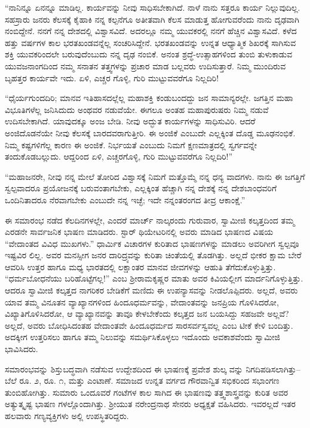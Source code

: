 “ನಾನಿನ್ನೂ ಏನನ್ನೂ ಮಾಡಿಲ್ಲ. ಕಾರ್ಯವನ್ನು ನೀವು ಸಾಧಿಸಬೇಕಾಗಿದೆ. ನಾಳೆ ನಾನು ಸತ್ತರೂ ಕಾರ್ಯ ನಿಲ್ಲುವುದಿಲ್ಲ. ಸಹಸ್ರಾರು ಜನರು ಕೆಲಸಕ್ಕೆ ಕೈಹಾಕಿ ನನ್ನ ಕಲ್ಪನೆಗೂ ಅತೀತವಾಗಿ ಕೆಲಸ ಮಾಡುತ್ತ ಹೋಗುವರೆಂದು ನಾನು ದೃಢವಾಗಿ ನಂಬಿದ್ದೇನೆ. ನನಗೆ ನನ್ನ ದೇಶದಲ್ಲಿ ವಿಶ್ವಾಸವಿದೆ. ಅದರಲ್ಲೂ ನಮ್ಮ ಯುವಕರಲ್ಲಿ ನನಗೆ ಹೆಚ್ಚಿನ ವಿಶ್ವಾಸವಿದೆ. ಕಳೆದ ಹತ್ತು ವರ್ಷಗಳ ಕಾಲ ಭರತಖಂಡವನ್ನೆಲ್ಲ ಸಂಚರಿಸಿದ್ದೇನೆ. ಭರತಖಂಡವನ್ನು ಉನ್ನತ ಆಧ್ಯಾತ್ಮಿಕ ಶಿಖರಕ್ಕೆ ಸಾಗಿಸುವ ಶಕ್ತಿ ಯುವಕರಿಂದಲೇ ಬರುವುದೆಂಬುದು ನನ್ನ ದೃಢ ನಂಬಿಕೆ. ಅನಂತ ಶ್ರದ್ಧೆ-ಉತ್ಸಾಹಗಳಿಂದ ತುಂಬಿ ತುಳುಕಾಡುವ ಯುವಜನಾಂಗದಿಂದ ನಮ್ಮ ಸನಾತನ ತತ್ತ್ವಗಳನ್ನು ಪ್ರಚಾರ ಮಾಡ ಬಲ್ಲವರು ಉದಿಸುತ್ತಾರೆ. ನಿಮ್ಮ ಮುಂದಿರುವ ಬೃಹತ್ತರ ಕಾರ್ಯವೇ ಇದು. ಏಳಿ, ಎಚ್ಚರ ಗೊಳ್ಳಿ, ಗುರಿ ಮುಟ್ಟುವವರೆಗೂ ನಿಲ್ಲದಿರಿ!

“ಧೈರ್ಯಗುಂದದಿರಿ; ಮಾನವ ಇತಿಹಾಸದಲ್ಲೆಲ್ಲ ಮಹಾಶಕ್ತಿ ಕಂಡುಬಂದದ್ದು ಜನ ಸಾಮಾನ್ಯರಲ್ಲೇ. ಜಗತ್ತಿನ ಮಹಾ ವಿಭೂತಿಗಳೆಲ್ಲ ಜನಿಸಿದುದು ಅಂಥವರ ನಡುವೆಯೇ. ಈಗಲೂ ಅಂತಹ ಮಹಾಪುರುಷರು ನಿಮ್ಮ ನಡುವೆ ಉದಿಸಬೇಕಾಗಿದೆ. ಯಾವುದಕ್ಕೂ ಅಂಜ ಬೇಡಿ. ನೀವು ಅದ್ಭುತ ಕಾರ್ಯಗಳನ್ನು ಸಾಧಿಸುವಿರಿ. ಆದರೆ ಅಂಜಿದೊಡನೆಯೇ ನೀವು ಕೆಲಸಕ್ಕೆ ಬಾರದವರಾಗುತ್ತೀರಿ. ಈ ಅಂಜಿಕೆ ಎಂಬುದೇ ಎಲ್ಲಕ್ಕಿಂತ ದೊಡ್ಡ ಮೂಢನಂಭಿಕೆ. ನಿಮ್ಮ ಕಷ್ಟಗಳಿಗೆಲ್ಲ ಕಾರಣ ಈ ಅಂಜಿಕೆ. ನಿರ್ಭಯತೆ ಎಂಬುದು ನಿಮಗೆ ಕ್ಷಣಮಾತ್ರದಲ್ಲಿ ಸ್ವರ್ಗವನ್ನೇ ತಂದುಕೊಡಬಲ್ಲುದು. ಆದ್ದರಿಂದ ಏಳಿ, ಎಚ್ಚರಗೊಳ್ಳಿ, ಗುರಿ ಮುಟ್ಟುವವರೆಗೂ ನಿಲ್ಲದಿರಿ!”

“ಮಹಾಜನರೇ, ನೀವು ನನ್ನ ಮೇಲೆ ತೋರಿದ ವಿಶ್ವಾಸಕ್ಕೆ ನಿಮಗೆ ಮತ್ತೊಮ್ಮೆ ನನ್ನ ಧನ್ಯ ವಾದಗಳು. ನಾನು ಈ ಜಗತ್ತಿಗೆ ಸ್ವಲ್ಪವಾದರೂ ಪ್ರಯೋಜನಕ್ಕೆ ಬರುವಂತಾಗಬೇಕು, ಎಲ್ಲಕ್ಕಿಂತ ಹೆಚ್ಚಾಗಿ ನನ್ನ ದೇಶಕ್ಕೆ ನನ್ನ ದೇಶಬಾಂಧವರಿಗೆ ಒಂದಿನಿತಾದರೂ ನೆರವಾಗಬೇಕು ಎಂಬುದೇ ನನ್ನ ಇಚ್ಛೆ; ಇದೇ ನನ್ನಂತರಂಗದ ತೀವ್ರ ಆಕಾಂಕ್ಷೆ.”

ಈ ಸಮಾರಂಭ ನಡೆದ ಕೆಲದಿನಗಳಲ್ಲೇ, ಎಂದರೆ ಮಾರ್ಚ್ ನಾಲ್ಕರಂದು ಗುರುವಾರ, ಸ್ವಾಮೀಜಿ ಕಲ್ಕತ್ತದಿಂದ ತಮ್ಮ ಎರಡನೇ ಸಾರ್ವಜನಿಕ ಭಾಷಣ ಮಾಡಿದರು. ಸ್ಟಾರ್ ಥಿಯೇಟರಿನಲ್ಲಿ ಅವರು ಮಾಡಿದ ಭಾಷಣದ ವಿಷಯ “ವೇದಾಂತದ ವಿವಿಧ ಮುಖಗಳು.” ಧಾರ್ಮಿಕ ವಿಚಾರಗಳ ಕುರಿತಾದ ಭಾಷಣಗಳನ್ನು ಮಾಡಲು ಅವರಿಗೀಗ ಸ್ವಲ್ಪವೂ ಇಷ್ಟವಿರ ಲಿಲ್ಲ. ಅವರ ಮನಸ್ಸೀಗ ಜನರ ದಾರಿದ್ರ್ಯವನ್ನು ಕುರಿತಾ ಚಿಂತೆಯಲ್ಲಿ ತೊಡಗಿತ್ತು. ಅಲ್ಲದೆ ಭೀಕರ ಕ್ಷಾಮ ಬೇರೆ ಆವರಿಸಿ ಉತ್ತರ ಹಾಗೂ ಮಧ್ಯ ಭಾರತದಲ್ಲಿ ಲಕ್ಷಾಂತರ ಮಾನವ ಜೀವಗಳನ್ನು ಆಹುತಿ ತೆಗೆದುಕೊಳ್ಳುತ್ತಿತ್ತು. “ಧರ್ಮಬೋಧನೆಯು ಬರಿಹೊಟ್ಟೆಗಲ್ಲ!” ಎಂಬ ಶ್ರೀರಾಮಕೃಷ್ಣರ ಮಾತು ಅವರ ಕಿವಿಯಲ್ಲೀಗ ಮಾರ್ದನಿಗೊಳ್ಳುತ್ತಿತ್ತು. ಆದರೂ ಸ್ವಾಮೀಜಿ ಕಲ್ಕತ್ತದ ನಾಗರಿಕರ ಬೇಡಿಕೆಗೆ ಮಣಿದು ಈ ಉಪನ್ಯಾಸವನ್ನು ನೀಡಲೊಪ್ಪಿದರು. ಅಲ್ಲದೆ, ಅವರು ಯಾವ ತಮ್ಮ ವಿನೂತನ ವ್ಯಾಖ್ಯಾನಗಳಿಂದ ಹಿಂದೂಧರ್ಮವನ್ನು, ವೇದಾಂತವನ್ನು ಜನಪ್ರಿಯ ಗೊಳಿಸಿದರೋ, ವಿಖ್ಯಾತಿಗೊಳಿಸಿದರೋ, ಆ ವ್ಯಾಖ್ಯಾನವನ್ನು ತಾವೂ ಕೇಳಬೇಕೆಂದು ಕಲ್ಕತ್ತದ ಜನ ಬಯಸಿದ್ದು ಸಹಜವೇ ಅಲ್ಲವೆ? ಅಲ್ಲದೆ, ಅವರು ಬೋಧಿಸಿದಂತಹ ವೇದಾಂತವೇ ಹಿಂದೂಧರ್ಮದ ಸಾರಸರ್ವಸ್ವವಲ್ಲ ಎಂಬ ಟೀಕೆ ಕೇಳಿ ಬಂದಿತ್ತು. ಅದಕ್ಕೀಗ ಉತ್ತರಿಸಲು ಹಾಗೂ ತಮ್ಮ ನಿಲುವನ್ನು ಸಮರ್ಥಿಸಿಕೊಳ್ಳಲು ಇದೊಂದು ಅವಕಾಶವೆಂದು ಸ್ವಾಮೀಜಿ ಭಾವಿಸಿದರು.

ಸಮಾರಂಭವನ್ನು ಶಿಸ್ತುಬದ್ಧವಾಗಿ ನಡೆಸುವ ಉದ್ದೇಶದಿಂದ ಈ ಭಾಷಣಕ್ಕೆ ಪ್ರವೇಶ ಶುಲ್ಕ ವನ್ನು ನಿಗದಿಪಡಿಸಲಾಗಿತ್ತು–ಬೆಲೆ ರೂ. ೨, ರೂ. ೧, ಮತ್ತು ಎಂಟಾಣೆ. ಸಮಾಜದ ಉನ್ನತ ವರ್ಗದ ಗೌರವಾನ್ವಿತ ಸಭಿಕರಿಂದ ಸಭಾಂಗಣ ತುಂಬಿಹೋಗಿತ್ತು. ಸುಮಾರು ಒಂದೂವರೆ ಗಂಟೆಗಳ ಕಾಲ ಸಾಗಿದ ಈ ಭಾಷಣವು ತತ್ತ್ವಶಾಸ್ತ್ರವನ್ನು ಕುರಿತ ಅವರ ಅತ್ಯುತ್ಕೃಷ್ಟ ಭಾಷಣ ಗಳಲ್ಲೊಂದಾಗಿತ್ತು. ಶ್ರೀಯುತ ನರೇಂದ್ರನಾಥ ಸೇನರು ಅಧ್ಯಕ್ಷತೆ ವಹಿಸಿದರು. ಇವರಲ್ಲದೆ ಇತರ ಹಲವಾರು ಗಣ್ಯವ್ಯಕ್ತಿಗಳು ಅಲ್ಲಿ ಉಪಸ್ಥಿತರಿದ್ದರು.

